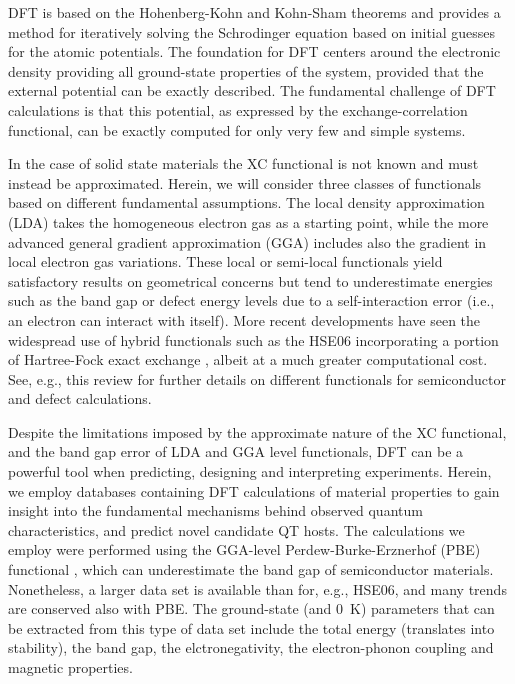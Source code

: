 \documentclass[superscriptaddress,unsortedaddress,
 amsmath,amssymb,
 aps,
]{revtex4-2}
\begin{document}
DFT is based on the Hohenberg-Kohn \cite{Hohenberg1964} and Kohn-Sham \cite{Kohn1965} theorems and provides a method for iteratively solving the Schrodinger equation based on initial guesses for the atomic potentials. 
The foundation for DFT centers around the electronic density providing all ground-state properties of the system, provided that the external potential can be exactly described. 
The fundamental challenge of DFT calculations is that this potential, as expressed by the exchange-correlation functional, can be exactly computed for only very few and simple systems.

In the case of solid state materials the XC functional is not known and must instead be approximated. 
Herein, we will consider three classes of functionals based on different fundamental assumptions. The local density approximation (LDA) takes the homogeneous electron gas as a starting point, while the more advanced general gradient approximation (GGA) includes also the gradient in local electron gas variations. 
These local or semi-local functionals yield satisfactory results on geometrical concerns but tend to underestimate energies such as the band gap or defect energy levels due to a self-interaction error (i.e., an electron can interact with itself). 
More recent developments have seen the widespread use of hybrid functionals such as the HSE06 incorporating a portion of Hartree-Fock exact exchange \cite{Heyd2003},  albeit at a much greater computational cost. 
See, e.g., this review \cite{Freysoldt2014} for further details on different functionals for semiconductor and defect calculations. 

Despite the limitations imposed by the approximate nature of the XC functional, and the band gap error of LDA and GGA level functionals, 
DFT can be a powerful tool when predicting, designing and interpreting experiments. 
Herein, we employ databases containing DFT calculations of material properties to gain insight into the fundamental mechanisms behind observed quantum characteristics, and predict novel candidate QT hosts. 
The calculations we employ were performed using the GGA-level Perdew-Burke-Erznerhof (PBE) functional \cite{Perdew1996}, which can underestimate the band gap of semiconductor materials.  
Nonetheless, a larger data set is available than for, e.g., HSE06, and many trends are conserved also with PBE. 
The ground-state (and $0$~K) parameters that can be extracted from this type of data set include the total energy (translates into stability), the band gap, the elctronegativity, the electron-phonon coupling and magnetic properties. 
\end{document}
